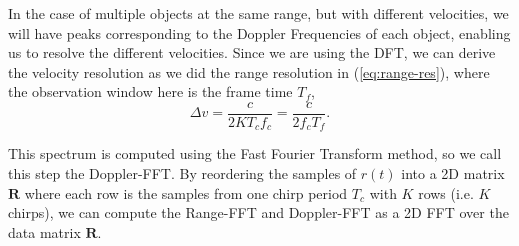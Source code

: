 In the case of multiple objects at the same range, but with different
velocities, we will have peaks corresponding to the Doppler Frequencies of each
object, enabling us to resolve the different velocities. Since we are using the
DFT, we can derive the velocity resolution as we did the range resolution in
(\ref{eq:range-res}), where the observation window here is the frame time $T_f$,
\begin{equation}
	\Delta v = \frac{c}{2 K T_c f_c} = \frac{c}{2 f_c T_f}.
\end{equation}

This spectrum is computed using the Fast Fourier Transform method, so we call
this step the Doppler-FFT. By reordering the samples of $r(t)$ into a 2D matrix
$\bm{R}$ where each row is the samples from one chirp period $T_c$ with $K$ rows
(i.e. $K$ chirps), we can compute the Range-FFT and Doppler-FFT as a 2D FFT over
the data matrix $\bm{R}$. 
